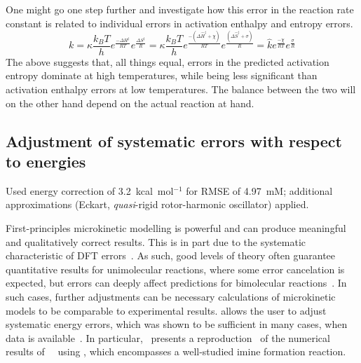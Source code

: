 One might go one step further and investigate how this error in the reaction rate constant
is related to individual errors in activation enthalpy and entropy errors.
%
\begin{equation}
	k = \kappa \frac{k_B T}{h} e^\frac{- \Delta H^\ddagger}{R T}
	e^\frac{  \Delta S^\ddagger}{R}
	= \kappa \frac{k_B T}{h} e^\frac{- \left(\Delta \widehat{H}^\ddagger + \chi\right)}{R T}
	e^\frac{        \left(\Delta \widehat{S}^\ddagger + \sigma\right)}{R}
	= \widehat{k}
	e^\frac{- \chi}{R T}
	e^\frac{  \sigma}{R}
\end{equation}
%
The above suggests that,
all things equal,
errors in the predicted activation entropy dominate at high temperatures,
while being less significant
than activation enthalpy errors at low temperatures.
The balance between the two will on the other hand depend on the actual reaction at hand.

\subsection{Adjustment of systematic errors with respect to energies}%
\label{sec:rates-error-prop-adj}

Used energy correction of 3.2~kcal~mol$^{-1}$ for RMSE of 4.97~mM;\@
additional approximations (Eckart,
\emph{quasi}-rigid rotor-harmonic oscillator) applied.

First-principles microkinetic modelling is powerful and can produce meaningful and qualitatively correct results.
This is in part due to the systematic characteristic of DFT errors~\cite{P_rez_Soto_2020}.
As such,
good levels of theory often guarantee quantitative results for unimolecular reactions,
where some error cancelation is expected,
but errors can deeply affect predictions for bimolecular reactions~\cite{P_rez_Soto_2020}.
In such cases,
further adjustments can be necessary calculations of microkinetic models to be comparable to experimental results.
\overreact{} allows the user to adjust systematic energy errors,
which was shown to be sufficient in many cases,
when data is available~\cite{Ahn_2019,P_rez_Soto_2020}.
In particular,~\citeauthor{Schneider_2022} presents a reproduction~\cite{Schneider_2022} of the numerical results of~\citeauthor{P_rez_Soto_2020}~\cite{P_rez_Soto_2020} using \overreact,
which encompasses a well-studied imine formation reaction.

